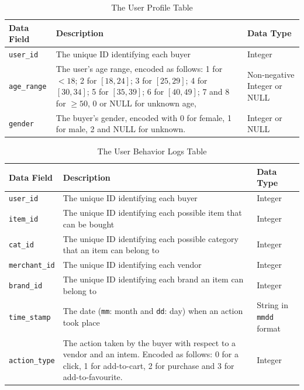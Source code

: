 \documentclass{article}
\begin{document}
\begin{table}[htbp]
    \centering
    \setlength{\extrarowheight}{3pt}
    \begin{tabular}{|p{20mm}|p{75mm}|p{31mm}|}
        \hline
        \textbf{Data Field} & \textbf{Description} & \textbf{Data Type} \\
        \hline
        \texttt{user\_id} & The unique ID identifying each buyer & Integer \\
        \hline
        \texttt{age\_range} & The user's age range, encoded as follows: 1 for $<18$; 2 for $[18,24]$; 3 for $[25,29]$; 4 for $[30,34]$; 5 for $[35,39]$; 6 for $[40,49]$; 7 and 8 for $\geq 50$, 0 or NULL for unknown age, & Non-negative Integer or NULL\\
        \hline
        \texttt{gender} & The buyer's gender, encoded with 0 for female, 1 for male, 2 and NULL for unknown. & Integer or NULL \\
        \hline
    \end{tabular}
    \vspace{0.3cm}
    \caption{The User Profile Table}
    \label{tab:user_profile}
\end{table}
\vspace{-0.3cm}
\begin{table}[htbp]
    \centering
    \setlength{\extrarowheight}{3pt}
    \begin{tabular}{|p{20mm}|p{75mm}|p{31mm}|}
        \hline
        \textbf{Data Field} & \textbf{Description} & \textbf{Data Type} \\
        \hline
        \texttt{user\_id} & The unique ID identifying each buyer & Integer \\
        \hline
        \texttt{item\_id} & The unique ID identifying each possible item that can be bought & Integer \\
        \hline
        \texttt{cat\_id} & The unique ID identifying each possible category that an item can belong to & Integer \\
        \hline
        \texttt{merchant\_id} & The unique ID identifying each vendor & Integer \\
        \hline
        \texttt{brand\_id} & The unique ID identifying each brand an item can belong to & Integer \\
        \hline
        \texttt{time\_stamp} & The date (\texttt{mm}: month and \texttt{dd}: day) when an action took place & String in \texttt{mmdd} format\\
        \hline
        \texttt{action\_type} & The action taken by the buyer with respect to a vendor and an intem. Encoded as follows: 0 for a click, 1 for add-to-cart, 2 for purchase and 3 for add-to-favourite. & Integer \\
        \hline
    \end{tabular}
    \vspace{0.3cm}
    \caption{The User Behavior Logs Table}
    \label{tab:user_behavior_logs}
\end{table}
\end{document}
